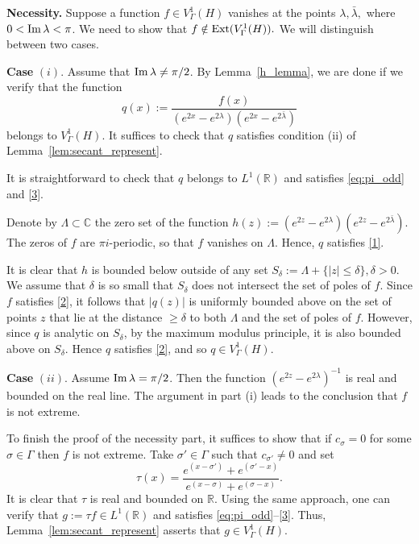 \documentclass[12pt]{amsart}
\numberwithin{equation}{section}
\theoremstyle{plain}
\theoremstyle{definition}
\newcommand{\R}{{\mathbb R}} \newcommand{\Q}{{\mathbb Q}} \newcommand{\Z}{{\mathbb Z}} \newcommand{\N}{{\mathbb N}}
\newcommand{\ext}{{\rm Ext}}
\begin{document}
{\bf Necessity.}
Suppose a function $f\in V^1_{\Gamma}(H)$ vanishes at the points
$\lambda, \bar \lambda,$ where $0<{\rm Im}\,\lambda <\pi$. We need to show that $f \notin \ext(V^1_{\Gamma}(H)).$ We will distinguish between two cases.


{\bf Case} $(i).$ Assume that ${\rm Im\,}\lambda\ne\pi/2$.
By Lemma~\ref{h_lemma}, we are done if we verify that the function 
\begin{equation}\label{q}q(x):=\frac{f(x)}{(e^{2x}-e^{2\lambda})(e^{2x}-e^{2\bar \lambda}) }\end{equation}
belongs to $V^1_{\Gamma}(H)$.
It suffices to check that $q$ satisfies condition (ii) of Lemma~\ref{lem:secant_represent}.

It is straightforward to check that $q$ belongs to $ L^1(\R)$ and satisfies \eqref{eq:pi_odd} and \eqref{3}. 

Denote by $\Lambda\subset\mathbb C$ the zero set of the function $h(z):= (e^{2z}-e^{2\lambda})(e^{2z}-e^{2\bar\lambda})$.
The zeros of $f$ are $\pi i$-periodic, so that $f$ vanishes on $\Lambda$. Hence, $q$ satisfies \eqref{1}.

It is clear that $h$ is bounded below outside of any set $S_\delta:=\Lambda+\{|z|\leq\delta\},\delta>0$.
We assume that $\delta$ is so small that $S_\delta$ does not intersect the set of poles of $f$. Since $f$ satisfies \eqref{2}, it follows that $|q(z)|$  is uniformly bounded above on the set of points $z$ that lie at the distance $\geq\delta$ to both $\Lambda$ and the set of poles of $f$. However, since $q$ is analytic on  $S_\delta$,  by the maximum modulus principle,  it is also bounded above on $S_\delta$. Hence $q$ satisfies \eqref{2}, and so $q\in V^1_{\Gamma}(H)$. 



{\bf Case }$(ii).$ Assume ${\rm Im \,}\lambda=\pi/2$. Then the function $\left(e^{2z}-e^{2\lambda}\right)^{-1}$ is real and bounded on the real line. The argument in part (i) leads to the conclusion that $f$ is not extreme. 

To finish the proof of the necessity part, it suffices to show that if $c_{\sigma} = 0$ for some $\sigma \in \Gamma$ then $f$ is not extreme. Take $\sigma' \in \Gamma$ such that $c_{\sigma'} \neq 0$ and set
$$
\tau(x) = \frac{e^{(x - \sigma')} + e^{(\sigma' - x)}}{ e^{(x-\sigma)} + e^{(\sigma -x)}}.
$$
It is clear that $\tau$ is real and bounded on $\R$. 
Using the same approach, one can verify that $g:=\tau f\in L^1(\R)$ and  satisfies \eqref{eq:pi_odd}--\eqref{3}.
Thus, Lemma~\ref{lem:secant_represent} asserts that $g \in V^1_{\Gamma}(H).$
\end{document}
